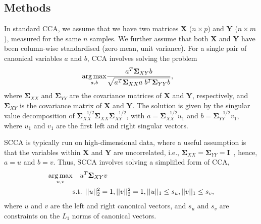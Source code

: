 \documentclass{bioinfo}
\DeclareMathOperator*{\argmax}{arg\,max}
\newcommand{\s}{\mathbf{\Sigma}}
\begin{document}
\vspace*{-12pt}
\begin{methods}
\section{Methods}

In standard CCA, we assume that we have two matrices $\mathbf{X}$ ($n \times p$)
and $\mathbf{Y}$ ($n \times m$), measured for the same $n$ samples.
We further assume that both $\mathbf{X}$ and $\mathbf{Y}$ have been
column-wise standardised (zero mean, unit variance).  For a single pair of 
canonical variables $a$ and $b$, CCA involves solving the problem
\vspace*{-10pt}
\begin{align}
\argmax_{a,b} & \frac{a^T \s_{XY} b}{\sqrt{a^T \s_{XX} a \; b^T \s_{YY} b}},
\label{eqn:cca}
\vspace*{-10pt}
\end{align}
where $\s_{XX}$ and $\s_{YY}$ are the covariance matrices of
$\mathbf{X}$ and $\mathbf{Y}$, respectively, and $\s_{XY}$ is the
covariance matrix of $\mathbf{X}$ and $\mathbf{Y}$. The solution is given by
the singular value decomposition of $\s_{XX}^{-1/2} \s_{XX}
\s_{XY}^{-1/2}$, with $a = \s_{XX}^{-1/2} u_1$ and $b =
\s_{YY}^{-1/2} v_1$, where $u_1$ and $v_1$ are the first left and right
singular vectors.

SCCA is typically run on high-dimensional data, where a useful assumption is that
the variables within $\mathbf{X}$ and $\mathbf{Y}$ are uncorrelated,
i.e., $\s_{XX}=\s_{YY}=\mathbf{I}$~\citep{Parkhomenko2009},
hence, $a = u$ and $b = v$. Thus, SCCA involves solving a simplified form of CCA,
\begin{align}
\argmax_{u,v} &  \quad u^T \s_{XY} v \notag \\
 & \mbox{s.t. } ||u||_2^2=1, ||v||_2^2 = 1, ||u||_1 \le s_u, ||v||_1 \le s_v,
\label{eqn:scca}\vspace*{-10pt}
\end{align}
where $u$ and $v$ are the left and right canonical vectors, 
and $s_u$ and $s_v$ are constraints on the $L_1$ norms
of canonical vectors.


\end{methods}
\end{document}
